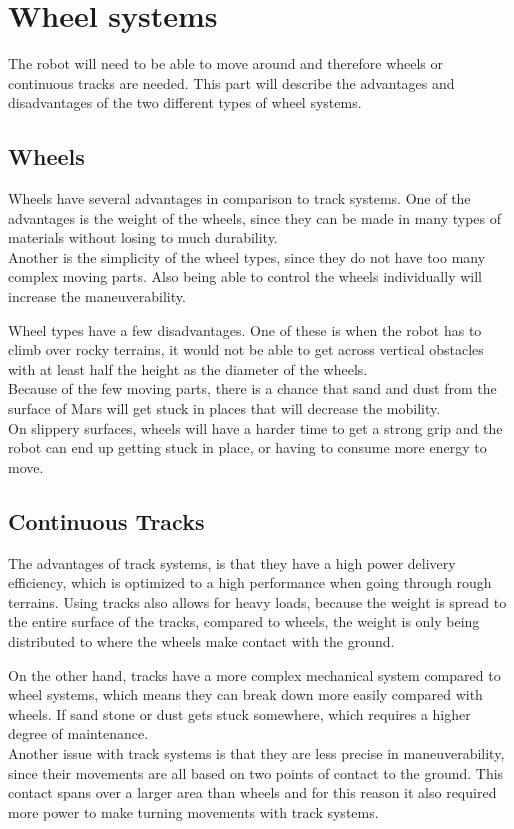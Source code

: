\section{Wheel systems}
The robot will need to be able to move around and therefore wheels or continuous tracks are needed. This part will describe the advantages and disadvantages of the two different types of wheel systems.


\subsection{Wheels}\label{ch:Wheels}
Wheels have several advantages in comparison to track systems. One of the advantages is the weight of the wheels, since they can be made in many types of materials without losing to much durability.\\
Another is the simplicity of the wheel types, since they do not have too many complex moving parts.
Also being able to control the wheels individually will increase the maneuverability.

Wheel types have a few disadvantages. One of these is when the robot has to climb over rocky terrains, it would not be able to get across vertical obstacles with at least half the height as the diameter of the wheels.\\ Because of the few moving parts, there is a chance that sand and dust from the surface of Mars will get stuck in places that will decrease the mobility.\\ On slippery surfaces, wheels will have a harder time to get a strong grip and the robot can end up getting stuck in place, or having to consume more energy to move\cite{Wheels1}\cite{Wheels2}.
\subsection{Continuous Tracks}
The advantages of track systems, is that they have a high power delivery efficiency, which is optimized to a high performance when going through rough terrains.
Using tracks also allows for heavy loads, because the weight is spread to the entire surface of the tracks, compared to wheels, the weight is only being distributed to where the wheels make contact with the ground.

On the other hand, tracks have a more complex mechanical system compared to wheel systems, which means they can break down more easily compared with wheels. If sand stone or dust gets stuck somewhere, which requires a higher degree of maintenance.\\
Another issue with track systems is that they are less precise in maneuverability, since their movements are all based on two points of contact to the ground. This contact spans over a larger area than wheels and for this reason it also required more power to make turning movements with track systems\cite{Wheels1}\cite{Wheels2}.

